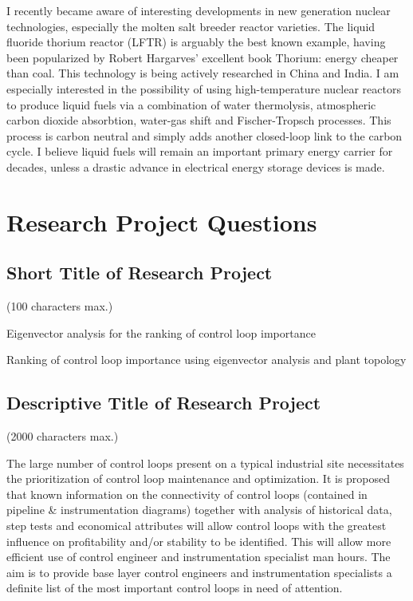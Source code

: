 \documentclass[a4paper]{book}
\begin{document}
I recently became aware of interesting developments in new generation nuclear technologies, especially the molten salt breeder reactor varieties.
The liquid fluoride thorium reactor (LFTR) is arguably the best known example, having been popularized by Robert Hargarves' excellent book Thorium: energy cheaper than coal.
This technology is being actively researched in China and India.
I am especially interested in the possibility of using high-temperature nuclear reactors to produce liquid fuels via a combination of water thermolysis, atmospheric carbon dioxide absorbtion, water-gas shift and Fischer-Tropsch processes.
This process is carbon neutral and simply adds another closed-loop link to the carbon cycle.
I believe liquid fuels will remain an important primary energy carrier for decades, unless a drastic advance in electrical energy storage devices is made.



\section{Research Project Questions}

\subsection{Short Title of Research Project}
(100 characters max.)

Eigenvector analysis for the ranking of control loop importance

Ranking of control loop importance using eigenvector analysis and plant topology

\subsection{Descriptive Title of Research Project}
(2000 characters max.)

The large number of control loops present on a typical industrial site necessitates the prioritization of control loop maintenance and optimization.
It is proposed that known information on the connectivity of control loops (contained in pipeline \& instrumentation diagrams) together with analysis of historical data, step tests and economical attributes will allow control loops with the greatest influence on profitability and/or stability to be identified.
This will allow more efficient use of control engineer and instrumentation specialist man hours.
The aim is to provide base layer control engineers and instrumentation specialists a definite list of the most important control loops in need of attention.
\end{document}
